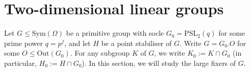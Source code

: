 \documentclass[twoside,a4paper,reqno,11pt]{amsart}
\newcommand{\<}{\langle}
\renewcommand{\>}{\rangle}
\newcommand{\la}{\langle}
\newcommand{\ra}{\rangle}
\newcommand{\leqs}{\leqslant}
\newcommand{\Out}{\mathrm{Out}}
\newcommand{\PSL}{\mathrm{PSL}}
\newcommand{\Tr}{\mathrm{Tr}}
\theoremstyle{definition}
\begin{document}
	\section{Two-dimensional linear groups}
	
	\label{s:PSL2}
	
	Let $G\leqs\mathrm{Sym}(\Omega)$ be a primitive group with socle $G_0 = \PSL_2(q)$ for some prime power $q = p^f$, and let $H$ be a point stabiliser of $G$. Write $G = G_0.O$ for some $O\leqs\Out(G_0)$. For any subgroup $K$ of $G$, we write $K_0:=K\cap G_0$ (in particular, $H_0:=H\cap G_0$). In this section, we will study the large fixers of $G$.
	
\end{document}
